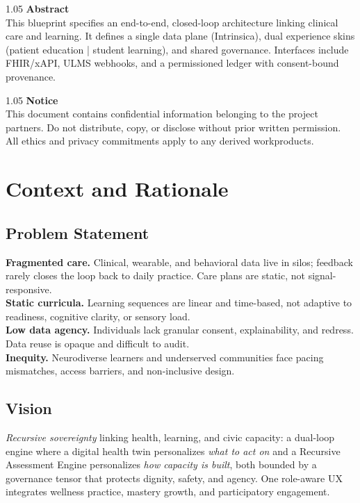 \documentclass[11pt]{article}
\theoremstyle{plain}
\begin{document}
\begin{titlepage}
  \begin{spacing}{1.05}\small
  \textbf{Abstract} \\
  This blueprint specifies an end-to-end, closed-loop architecture linking clinical care and learning. It defines a single data plane (Intrinsica), dual experience skins (patient education | student learning), and shared governance. Interfaces include FHIR/xAPI, ULMS webhooks, and a permissioned ledger with consent-bound provenance.
  \end{spacing}

  \vfill

  \begin{spacing}{1.05}\footnotesize
  \textbf{Notice} \\
  This document contains confidential information belonging to the project partners. Do not distribute, copy, or disclose without prior written permission. All ethics and privacy commitments apply to any derived workproducts.
  \end{spacing}

\end{titlepage}
\newpage
\section{Context and Rationale}

\subsection{Problem Statement}
\textbf{Fragmented care.} Clinical, wearable, and behavioral data live in silos; feedback rarely closes the loop back to daily practice. Care plans are static, not signal-responsive. \\
\textbf{Static curricula.} Learning sequences are linear and time-based, not adaptive to readiness, cognitive clarity, or sensory load. \\
\textbf{Low data agency.} Individuals lack granular consent, explainability, and redress. Data reuse is opaque and difficult to audit. \\
\textbf{Inequity.} Neurodiverse learners and underserved communities face pacing mismatches, access barriers, and non-inclusive design.

\subsection{Vision}
\emph{Recursive sovereignty} linking health, learning, and civic capacity: a dual-loop engine where a digital health twin personalizes \emph{what to act on} and a Recursive Assessment Engine personalizes \emph{how capacity is built}, both bounded by a governance tensor that protects dignity, safety, and agency. One role-aware UX integrates wellness practice, mastery growth, and participatory engagement.
\end{document}
